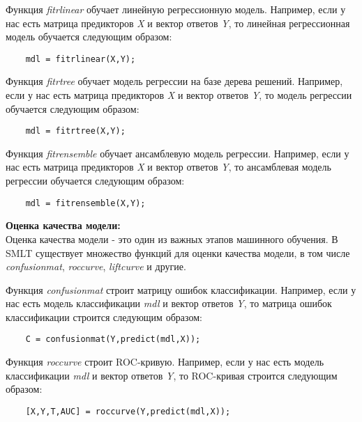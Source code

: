 \documentclass[a4paper, 12pt]{article}%
\begin{document}
\begin{titlepage}
	Функция \textit{fitrlinear} обучает линейную регрессионную модель. Например, если у нас есть матрица предикторов \textit{X} и вектор ответов \textit{Y}, то линейная регрессионная модель обучается следующим образом:\\
	
	
	\begin{lstlisting}
	mdl = fitrlinear(X,Y);
	\end{lstlisting}
	
	
	Функция \textit{fitrtree} обучает модель регрессии на базе дерева решений. Например, если у нас есть матрица предикторов \textit{X} и вектор ответов \textit{Y}, то модель регрессии обучается следующим образом:\\
	
	
	\begin{lstlisting}
	mdl = fitrtree(X,Y);
	\end{lstlisting}
	
	
	Функция \textit{fitrensemble} обучает ансамблевую модель регрессии. Например, если у нас есть матрица предикторов \textit{X} и вектор ответов \textit{Y}, то ансамблевая модель регрессии обучается следующим образом:\\
	
	
	\begin{lstlisting}
	mdl = fitrensemble(X,Y);
	\end{lstlisting}
	
	
	\textbf{Оценка качества модели:}\\
	Оценка качества модели - это один из важных этапов машинного обучения. В SMLT существует множество функций для оценки качества модели, в том числе \textit{confusionmat}, \textit{roccurve}, \textit{liftcurve} и другие.
	
	Функция \textit{confusionmat} строит матрицу ошибок классификации. Например, если у нас есть модель классификации \textit{mdl} и вектор ответов \textit{Y}, то матрица ошибок классификации строится следующим образом:\\
	
	
	\begin{lstlisting}
	C = confusionmat(Y,predict(mdl,X));
	\end{lstlisting}
	
	
	Функция \textit{roccurve} строит ROC-кривую. Например, если у нас есть модель классификации \textit{mdl} и вектор ответов \textit{Y}, то ROC-кривая строится следующим образом:\\
	
	
	\begin{lstlisting}
	[X,Y,T,AUC] = roccurve(Y,predict(mdl,X));
	\end{lstlisting}
	

\end{titlepage}
\end{document}
